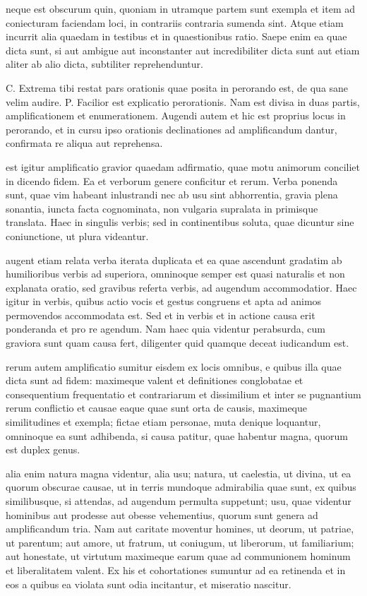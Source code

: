  neque est obscurum quin, quoniam in utramque partem sunt exempla et item ad coniecturam faciendam loci, in contrariis contraria sumenda sint. Atque etiam incurrit alia quaedam in testibus et in quaestionibus ratio. Saepe enim ea quae dicta sunt, si aut ambigue aut inconstanter aut incredibiliter dicta sunt aut etiam aliter ab alio dicta, subtiliter reprehenduntur.

 C. Extrema tibi restat pars orationis quae posita in perorando est, de qua sane velim audire. P. Facilior est explicatio perorationis. Nam est divisa in duas partis, amplificationem et enumerationem. Augendi autem et hic est proprius locus in perorando, et in cursu ipso orationis declinationes ad amplificandum dantur, confirmata re aliqua aut reprehensa.

 est igitur amplificatio gravior quaedam adfirmatio, quae motu animorum conciliet in dicendo fidem. Ea et verborum genere conficitur et rerum. Verba ponenda sunt, quae vim habeant inlustrandi nec ab usu sint abhorrentia, gravia plena sonantia, iuncta facta cognominata, non vulgaria supralata in primisque translata. Haec in singulis verbis; sed in continentibus soluta, quae dicuntur sine coniunctione, ut plura videantur.

 augent etiam relata verba iterata duplicata et ea quae ascendunt gradatim ab humilioribus verbis ad superiora, omninoque semper est quasi naturalis et non explanata oratio, sed gravibus referta verbis, ad augendum accommodatior. Haec igitur in verbis, quibus actio vocis et gestus congruens et apta ad animos permovendos accommodata est. Sed et in verbis et in actione causa erit ponderanda et pro re agendum. Nam haec quia videntur perabsurda, cum graviora sunt quam causa fert, diligenter quid quamque deceat iudicandum est.

 rerum autem amplificatio sumitur eisdem ex locis omnibus, e quibus illa quae dicta sunt ad fidem: maximeque valent et definitiones conglobatae et consequentium frequentatio et contrariarum et dissimilium et inter se pugnantium rerum conflictio et causae eaque quae sunt orta de causis, maximeque similitudines et exempla; fictae etiam personae, muta denique loquantur, omninoque ea sunt adhibenda, si causa patitur, quae habentur magna, quorum est duplex genus.

 alia enim natura magna videntur, alia usu; natura, ut caelestia, ut divina, ut ea quorum obscurae causae, ut in terris mundoque admirabilia quae sunt, ex quibus similibusque, si attendas, ad augendum permulta suppetunt; usu, quae videntur hominibus aut prodesse aut obesse vehementius, quorum sunt genera ad amplificandum tria. Nam aut caritate moventur homines, ut deorum, ut patriae, ut parentum; aut amore, ut fratrum, ut coniugum, ut liberorum, ut familiarium; aut honestate, ut virtutum maximeque earum quae ad communionem hominum et liberalitatem valent. Ex his et cohortationes sumuntur ad ea retinenda et in eos a quibus ea violata sunt odia incitantur, et miseratio nascitur.

